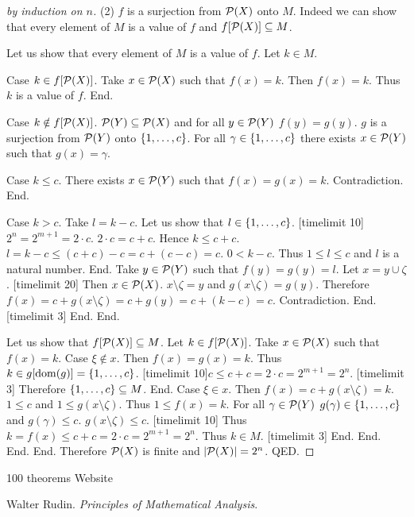 \documentclass{article}
\begin{document}
\begin{forthel}
\begin{proof}[by induction on $n$]
    (2) $f$ is a surjection from ${\cal P}(X)$ onto $M$. 
    Indeed we can show that every element of $M$ is a value of $f$ and $f[{\cal P}(X)] \subseteq M$.
 
      Let us show that every element of $M$ is a value of $f$.
        Let $k \in M$.

        Case $k \in f[{\cal P}(X)]$. Take $x \in {\cal P}(X)$ such that $f(x) = k$. Then $f(x) = k$. Thus $k$ is a value of $f$. End.

        Case $k \notin f[{\cal P}(X)]$.
          ${\cal P}(Y) \subseteq {\cal P}(X)$ and for all $y \in {\cal P}(Y)$ $f(y) = g(y)$. $g$ is a surjection from ${\cal P}(Y)$ onto $\{1,\dots,c\}$.
          For all $\gamma \in \{1,\dots,c\}$ there exists $x \in {\cal P}(Y)$ such that $g(x) = \gamma$.
        
          Case $k \leq c$. There exists $x \in {\cal P}(Y)$ such that $f(x) = g(x) = k$. Contradiction. End.
        
          Case $k > c$. Take $l = k - c$.
            Let us show that $l \in \{1,\dots,c\}$. [timelimit 10]
              $2^{n} = 2^{m+1} = 2 \cdot c$. $2 \cdot c = c + c$. Hence $k \leq c + c$. 
              $l = k - c \leq (c + c) - c = c + (c - c) = c$. 
              $0 < k - c$. Thus $1 \leq l \leq c$ and $l$ is a natural number. End.
            Take $y \in {\cal P}(Y)$ such that $f(y) = g(y) = l$. Let $x = y \cup \zeta$. 
            [timelimit 20]
            Then $x \in {\cal P}(X)$. $x \setminus \zeta = y$ and $g(x \setminus \zeta) = g(y)$. 
            Therefore $f(x) = c + g(x \setminus \zeta) = c + g(y) = c + (k - c) = c$. Contradiction. End. [timelimit 3]  
        End. 
      End.

      Let us show that $f[{\cal P}(X)] \subseteq M$.
        Let $k \in f[{\cal P}(X)]$. Take $x \in {\cal P}(X)$ such that $f(x) = k$.
        Case $\xi \notin x$. Then $f(x) = g(x) = k$. Thus $k \in g[\operatorname{dom}(g)] = \{1,\dots,c\}$. 
          [timelimit 10]$c \leq c + c = 2 \cdot c = 2^{m+1} = 2^{n}$. [timelimit 3] Therefore $\{1,\dots,c\} \subseteq M$. End.
        Case $\xi \in x$. Then $f(x) = c + g(x \setminus \zeta) = k$. $1 \leq c$ and $1 \leq g(x \setminus \zeta)$. Thus $1 \leq f(x) = k$.
          For all $\gamma \in {\cal P}(Y)$ $g(\gamma) \in \{1,\dots,c\}$ and $g(\gamma) \leq c$.
          $g(x \setminus \zeta) \leq c$. [timelimit 10] Thus $k = f(x) \leq c + c = 2 \cdot c = 2^{m+1}= 2^{n}$. Thus $k \in M$. [timelimit 3]
        End.
      End.
    End.
  End.
  Therefore ${\cal P}(X)$ is finite and $|{\cal P}(X)| = 2^{n}$.
QED.
\end{proof}
\end{forthel}

\begin{thebibliography}{plain}
 100 theorems
 Website

 Walter Rudin. \textit{Principles of Mathematical
Analysis}.
\end{thebibliography}
\end{document}
